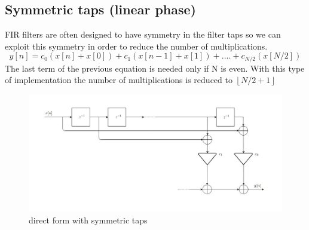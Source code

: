 \subsection{Symmetric taps (linear phase)}
FIR filters are often designed to have symmetry in the filter taps so we can  exploit this symmetry in order to reduce the number of multiplications.
$$y[n]= c_{0}(x[n]+x[0])+c_{1}(x[n-1]+x[1])+....+c_{N/2}(x[N/2])$$
The last term of the previous equation is needed only if N is even.
With this type of implementation the number of multiplications is reduced to $\left \lfloor N/2+1 \right \rfloor$
\begin{figure}[H]
    \centering
    \includegraphics[scale=0.45]{images/symmetryc.jpg}    
    \caption{direct form with symmetric taps}
    \label{fig:symmetric}
\end{figure}

